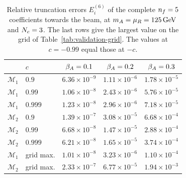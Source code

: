 \begin{table}[t]
\centering


\setlength{\tabcolsep}{3pt}
\begin{tabular}{llccc}
\toprule
& $c$ & $\beta_A=0.1$ & $\beta_A=0.2$ & $\beta_A=0.3$ \\
\midrule
$\mathcal M_1$ & $0.9$ & $6.36\times10^{-9}$ & $1.11\times10^{-6}$ & $1.78\times10^{-5}$ \\
$\mathcal M_1$ & $0.99$ & $1.06\times10^{-8}$ & $2.43\times10^{-6}$ & $5.76\times10^{-5}$ \\
$\mathcal M_1$ & $0.999$ & $1.23\times10^{-8}$ & $2.96\times10^{-6}$ & $7.18\times10^{-5}$ \\
$\mathcal M_2$ & $0.9$ & $1.39\times10^{-7}$ & $3.08\times10^{-5}$ & $6.68\times10^{-4}$ \\
$\mathcal M_2$ & $0.99$ & $6.68\times10^{-8}$ & $1.47\times10^{-5}$ & $2.88\times10^{-4}$ \\
$\mathcal M_2$ & $0.999$ & $6.21\times10^{-8}$ & $1.65\times10^{-5}$ & $3.74\times10^{-4}$ \\
$\mathcal M_1$ & grid max. & $1.01\times10^{-8}$ & $3.23\times10^{-6}$ & $1.10\times10^{-4}$ \\
$\mathcal M_2$ & grid max. & $2.33\times10^{-7}$ & $6.77\times10^{-5}$ & $1.94\times10^{-3}$ \\
\bottomrule
\end{tabular}
\caption{Relative truncation errors $E_i^{(6)}$ of the complete $n_f=5$ coefficients towards the beam, at $m_A=\mu_R=125\,\mathrm{GeV}$ and $N_c=3$. The last rows give the largest value on the grid of Table~\ref{tab:validation-grid}. The values at $c=-0.99$ equal those at $-c$.}
\label{tab:forward-angles}
\end{table}
